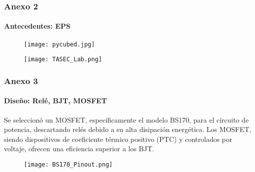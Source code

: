 \begin{frame}
    \frametitle{Anexo 2}
    \framesubtitle{Antecedentes: EPS}
    \begin{figure}
        \centering
        \begin{minipage}{.5\textwidth}
            \centering
            \texttt{[image: pycubed.jpg]} %
            \label{fig:sat3}
        \end{minipage}\hfill
        \begin{minipage}{.5\textwidth}
            \centering
            \texttt{[image: TASEC\_Lab.png]} %
            \vspace*{0.5 cm}
            \label{fig:sat4}
        \end{minipage}
    \end{figure}    
    \end{frame}



\begin{frame}
    \frametitle{Anexo 3}
    \framesubtitle{Diseño: Relé, BJT, MOSFET}
    Se seleccionó un MOSFET, específicamente el modelo BS170, para el circuito de potencia, descartando relés debido a su alta disipación energética. Los MOSFET, siendo dispositivos de coeficiente térmico positivo (PTC) y controlados por voltaje, ofrecen una eficiencia superior a los BJT.
    \begin{figure}[H]
        \centering
        \texttt{[image: BS170\_Pinout.png]} %
        \label{fig:BS170MOSFET}
    \end{figure}
    
    \end{frame}
    
    
